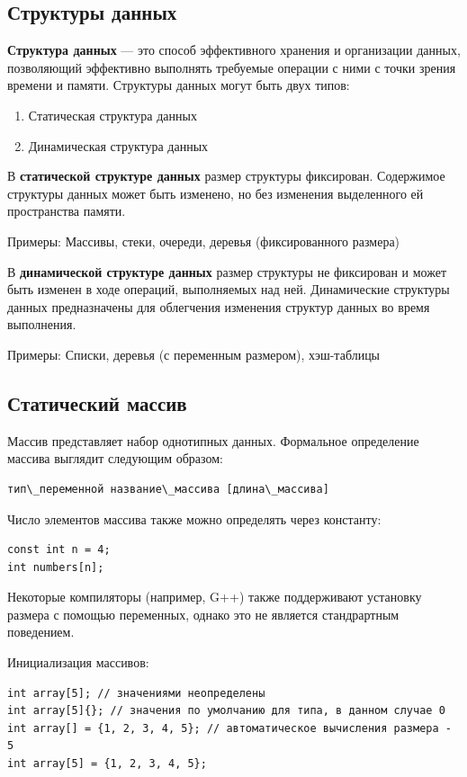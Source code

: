 \subsection{Структуры данных}

\textbf{Структура данных} — это способ эффективного хранения и организации данных, позволяющий эффективно выполнять требуемые операции с ними с точки зрения времени и памяти. Структуры данных могут быть двух типов:
\begin{enumerate}
    \item Статическая структура данных
    \item Динамическая структура данных
\end{enumerate}

В \textbf{статической структуре данных} размер структуры фиксирован. Содержимое структуры данных может быть изменено, но без изменения выделенного ей пространства памяти.

Примеры: Массивы, стеки, очереди, деревья (фиксированного размера)

В \textbf{динамической структуре данных} размер структуры не фиксирован и может быть изменен в ходе операций, выполняемых над ней. Динамические структуры данных предназначены для облегчения изменения структур данных во время выполнения.

Примеры: Списки, деревья (с переменным размером), хэш-таблицы

\subsection{Статический массив}

Массив представляет набор однотипных данных. Формальное определение массива выглядит следующим образом:

\begin{verbatim}
тип\_переменной название\_массива [длина\_массива]
\end{verbatim}

Число элементов массива также можно определять через константу:

\begin{verbatim}
const int n = 4;
int numbers[n];
\end{verbatim}

Некоторые компиляторы (например, G++) также поддерживают установку размера с помощью переменных, однако это не является стандрартным поведением.

Инициализация массивов:
\begin{verbatim}
int array[5]; // значениями неопределены
int array[5]{}; // значения по умолчанию для типа, в данном случае 0
int array[] = {1, 2, 3, 4, 5}; // автоматическое вычисления размера - 5
int array[5] = {1, 2, 3, 4, 5};
\end{verbatim}

